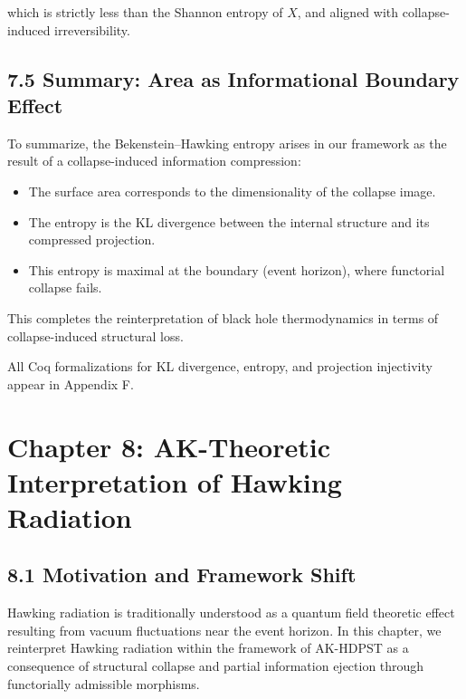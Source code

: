 \documentclass[11pt]{article}
\begin{document}
which is strictly less than the Shannon entropy of \( X \), and aligned with collapse-induced irreversibility.

\subsection*{7.5 Summary: Area as Informational Boundary Effect}

To summarize, the Bekenstein–Hawking entropy arises in our framework as the result of a collapse-induced information compression:

\begin{itemize}
    \item The surface area corresponds to the dimensionality of the collapse image.
    \item The entropy is the KL divergence between the internal structure and its compressed projection.
    \item This entropy is maximal at the boundary (event horizon), where functorial collapse fails.
\end{itemize}

This completes the reinterpretation of black hole thermodynamics in terms of collapse-induced structural loss.

All Coq formalizations for KL divergence, entropy, and projection injectivity appear in Appendix F.



\section{Chapter 8: AK-Theoretic Interpretation of Hawking Radiation}

\subsection*{8.1 Motivation and Framework Shift}

Hawking radiation is traditionally understood as a quantum field theoretic effect resulting from vacuum fluctuations near the event horizon. In this chapter, we reinterpret Hawking radiation within the framework of AK-HDPST as a consequence of structural collapse and partial information ejection through functorially admissible morphisms.
\end{document}
